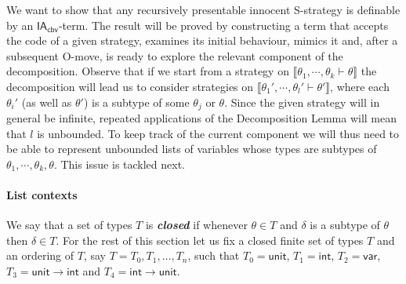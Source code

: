 \documentclass{CSML}
\theoremstyle{definition}\newtheorem{definition}[thm]{Definition}
\theoremstyle{definition}\newtheorem{example}[thm]{Example}
\theoremstyle{definition}\newtheorem{proposition}[thm]{Proposition}
\theoremstyle{definition}\newtheorem{lemma}[thm]{Lemma}
\theoremstyle{definition}\newtheorem{theorem}[thm]{Theorem}
\theoremstyle{definition}\newtheorem{corollary}[thm]{Corollary}
\theoremstyle{definition}\newtheorem{remark}[thm]{Remark}
\newcommand\Scat{\mathcal{S}}
\newcommand\Scatinn{\Scat_{\rm inn}}
\newcommand\recur{\mathcal{R}}
\renewcommand\int{\mathsf{int}}
\newcommand\var{\mathsf{var}}
\newcommand\code[1]{\lceil#1\rceil}
\newcommand\viewf{\mathsf{viewf}}
\newcommand\boldemph[1]{\emph{\textbf{#1}}}
\newcommand\iacbv{\mathsf{IA}_{\mathsf{cbv}}}
\newcommand\comt{\mathsf{unit}}
\newcommand\expt{\mathsf{int}}
\newcommand\cutout[1]{}
\newcommand\sem[1]{\llbracket #1 \rrbracket}
\begin{document}
\cutout{
We write $\recur$ for the wide subcategory of $\Scatinn$ containing  recursive S-strategies.
Above we used the fact that recursive S-strategies are closed under composition.
Since all our language constructors preserve recursiveness, $\recur$ is a sound model of $\iacbv$.
We therefore encode an innocent S-strategy $\sigma$ by $\code{\sigma}$ where the latter is seen indifferently as the index $n$ such that either $\sigma=W_n$ or $\viewf(\sigma)=\phi_n$. 
}

We want to show that any recursively presentable innocent S-strategy is definable by an $\iacbv$-term. The result will be proved by constructing a term that accepts the code of a given strategy, examines its initial behaviour, mimics it and, after a subsequent O-move, is ready to explore the relevant component of the decomposition. 
Observe that if we start from a strategy on $\sem{\theta_1,\cdots,\theta_k\vdash\theta}$ the decomposition will lead us to consider strategies on $\sem{\theta_1',\cdots,\theta_l'\vdash\theta'}$, where each $\theta_i'$ (as well as $\theta'$) is a subtype of some $\theta_j$ or $\theta$. Since the given strategy will in general be infinite, repeated applications of the Decomposition Lemma will mean that $l$ is unbounded. To keep track of the current component we will thus need to be able to represent unbounded lists of variables whose types are subtypes of $\theta_1,\cdots,\theta_k,\theta$. This issue is tackled next.

\paragraph{\bf List contexts} 
We say that a set of types $T$ is \boldemph{closed} if whenever $\theta\in T$ and $\delta$ is a subtype of $\theta$ then $\delta\in T$. 
For the rest of this section let us fix a closed finite set of types $T$ and an ordering of $T$, say $T=T_0,T_1,\dots,T_n$, such that 
$T_0=\comt$, $T_1=\int$, $T_2=\var$,
$T_3=\comt\to\expt$ and $T_4=\expt\to\comt$.
\end{document}
